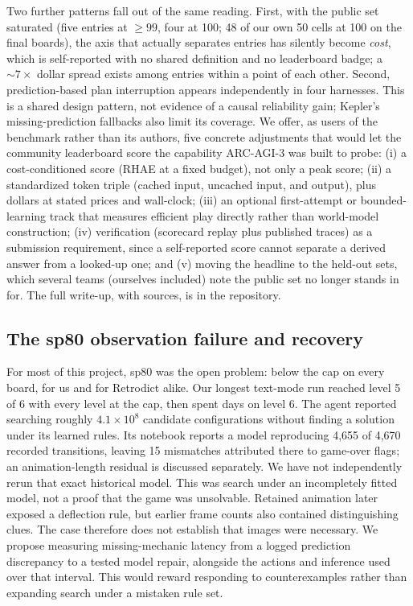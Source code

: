 \documentclass[11pt]{article}
\begin{document}
Two further patterns fall out of the same reading. First, with the public set
saturated (five entries at ${\ge}99$, four at 100; 48 of our own 50 cells at 100 on the final boards),
the axis that actually separates entries has silently become \emph{cost}, which
is self-reported with no shared definition and no leaderboard badge; a ${\sim}7\times$
dollar spread exists among entries within a point of each other. Second,
prediction-based plan interruption appears independently in four harnesses.
This is a shared design pattern, not evidence of a causal reliability gain;
Kepler's missing-prediction fallbacks also limit its coverage. We offer, as users
of the benchmark rather than its authors, five
concrete adjustments that would let the community leaderboard score the
capability ARC-AGI-3 was built to probe: (i) a cost-conditioned score (RHAE at a
fixed budget), not only a peak score; (ii) a standardized token triple (cached
input, uncached input, and output), plus dollars at stated prices and wall-clock;
(iii) an
optional first-attempt or bounded-learning track that measures efficient play
directly rather than world-model construction; (iv) verification (scorecard
replay plus published traces) as a submission requirement, since a self-reported
score cannot separate a derived answer from a looked-up one; and (v) moving the
headline to the held-out sets, which several teams (ourselves included) note the
public set no longer stands in for. The full write-up, with sources, is in the
repository.

\subsection{The sp80 observation failure and recovery}\label{sec:sp80}

For most of this project, sp80 was the open problem: below the cap on every board, for us and for Retrodict alike. Our longest text-mode run reached level 5 of 6 with every level at the cap, then spent days on level 6. The agent reported searching roughly $4.1\times10^{8}$ candidate configurations without finding a solution under its learned rules. Its notebook reports a model reproducing 4,655 of 4,670 recorded transitions, leaving 15 mismatches attributed there to game-over flags; an animation-length residual is discussed separately. We have not independently rerun that exact historical model. This was search under an incompletely fitted model, not a proof that the game was unsolvable. Retained animation later exposed a deflection rule, but earlier frame counts also contained distinguishing clues. The case therefore does not establish that images were necessary. We propose measuring missing-mechanic latency from a logged prediction discrepancy to a tested model repair, alongside the actions and inference used over that interval. This would reward responding to counterexamples rather than expanding search under a mistaken rule set.
\end{document}
